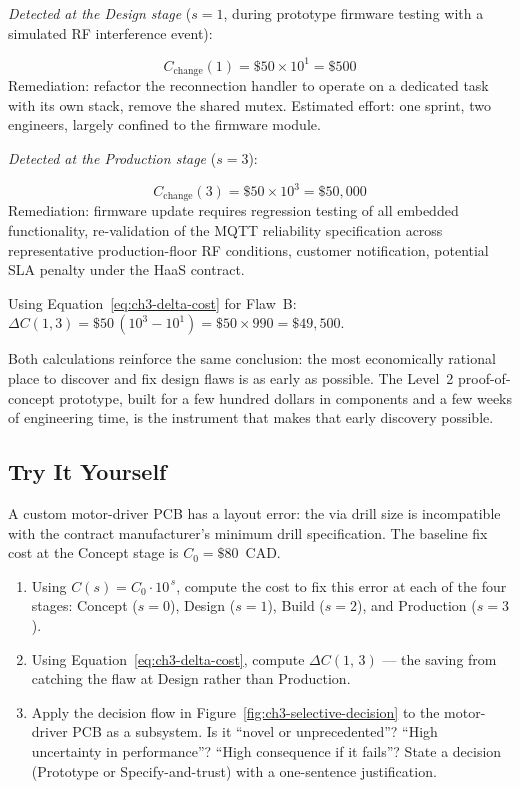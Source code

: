 \medskip
\noindent\textit{Detected at the Design stage} ($s = 1$, during prototype
firmware testing with a simulated RF interference event):

\begin{equation}
  C_{\text{change}}(1) = \$50 \times 10^1 = \$500
  \label{eq:ch3-flaw-b-design}
\end{equation}
Remediation: refactor the reconnection handler to operate on a dedicated task
with its own stack, remove the shared mutex.
Estimated effort: one sprint, two engineers, largely confined to the firmware
module.

\medskip
\noindent\textit{Detected at the Production stage} ($s = 3$):

\begin{equation}
  C_{\text{change}}(3) = \$50 \times 10^3 = \$50{,}000
  \label{eq:ch3-flaw-b-production}
\end{equation}
Remediation: firmware update requires regression testing of all embedded
functionality, re-validation of the MQTT reliability specification across
representative production-floor RF conditions, customer notification, potential
SLA penalty under the HaaS contract.

\medskip
\noindent Using Equation~\ref{eq:ch3-delta-cost} for Flaw~B:
$\Delta C(1,3) = \$50\,(10^3 - 10^1) = \$50 \times 990 = \$49{,}500$.

\medskip
Both calculations reinforce the same conclusion: the most economically
rational place to discover and fix design flaws is as early as possible.
The Level~2 proof-of-concept prototype, built for a few hundred dollars in
components and a few weeks of engineering time, is the instrument that makes
that early discovery possible.

\subsection*{Try It Yourself}

A custom motor-driver PCB has a layout error: the via drill size is incompatible
with the contract manufacturer's minimum drill specification.  The baseline fix
cost at the Concept stage is $C_0 = \$80$~CAD.

\begin{enumerate}
  \item Using $C(s) = C_0 \cdot 10^{\,s}$, compute the cost to fix this error at
        each of the four stages: Concept ($s=0$), Design ($s=1$), Build ($s=2$),
        and Production ($s=3$).
  \item Using Equation~\ref{eq:ch3-delta-cost}, compute $\Delta C(1,\,3)$ ---
        the saving from catching the flaw at Design rather than Production.
  \item Apply the decision flow in Figure~\ref{fig:ch3-selective-decision} to the
        motor-driver PCB as a subsystem. Is it ``novel or unprecedented''?
        ``High uncertainty in performance''? ``High consequence if it fails''?
        State a decision (Prototype or Specify-and-trust) with a one-sentence
        justification.
\end{enumerate}

